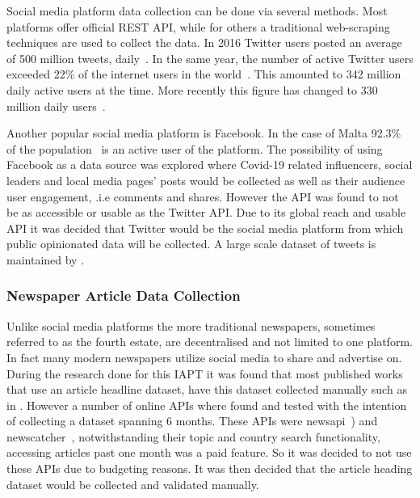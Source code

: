 Social media platform data collection can be done via several methods.
Most platforms offer official \ac{REST} \ac{API}, while for others a traditional web-scraping techniques are used to collect the data.
In 2016 Twitter users posted an average of 500 million tweets, daily~\citep{Crannell2016}.
In the same year, the number of active Twitter users exceeded 22\% of the internet users in the world~\citep{Kayser2016}.
This amounted to 342 million daily active users at the time.
More recently this figure has changed to 330 million daily users~\citep{tankovska_2021}.

Another popular social media platform is Facebook.
In the case of Malta 92.3\% of the population~\citep{napoleoncat} is an active user of the platform.
The possibility of using Facebook as a data source was explored where Covid-19 related influencers, social leaders and local media pages' posts would be collected as well as their audience user engagement, .i.e comments and shares.
However the \ac{API} was found to not be as accessible or usable as the Twitter \ac{API}.
Due to its global reach and usable \ac{API} it was decided that Twitter would be the social media platform from which public opinionated data will be collected.
A large scale dataset of tweets is maintained by \citet{banda2020largescale}.

\subsubsection{Newspaper Article Data Collection}

Unlike social media platforms the more traditional newspapers, sometimes referred to as the fourth estate, are decentralised and not limited to one platform.
In fact many modern newspapers utilize social media to share and advertise on.
During the research done for this \ac{IAPT} it was found that most published works that use an article headline dataset, have this dataset collected manually such as in \citet{newspaper_headlines}.
However a number of online \ac{API}s where found and tested with the intention of collecting a dataset spanning 6 months.
These \ac{API}s were newsapi~\citep{newsapi}) and newscatcher~\citep{newscatcher}, notwithstanding their topic and country search functionality, accessing articles past one month was a paid feature.
So it was decided to not use these \ac{API}s due to budgeting reasons.
It was then decided that the article heading dataset would be collected and validated manually.

